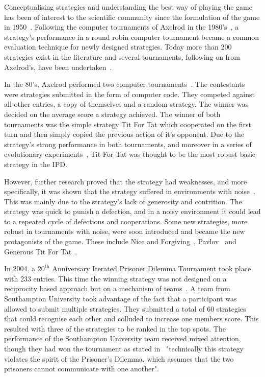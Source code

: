 \documentclass{article}
\begin{document}
Conceptualising strategies and understanding the best way of playing the game
has been of interest to the scientific community since the formulation of the
game in 1950~\cite{Flood1958}. Following the computer tournaments of Axelrod in the
1980's~\cite{Axelrod1980a, Axelrod1980b}, a strategy's performance in a round
robin computer tournament became a common evaluation technique for newly designed
strategies. Today more than 200 strategies exist in the literature and several
tournaments, following on from Axelrod's, have been undertaken~\cite{Bendor1991,
Harper2017, Kendall2007, Stephens2002, Stewart2012}.

In the 80's, Axelrod performed two computer tournaments~\cite{Axelrod1980a,
Axelrod1980b}. The contestants were strategies submitted in the form of computer
code. They competed against all other entries, a copy of themselves and a random
strategy. The winner was decided on the average score a strategy achieved. The
winner of both tournaments was the simple strategy Tit For Tat which cooperated
on the first turn and then simply copied the previous action of it's opponent.
Due to the strategy's strong performance in both tournaments, and moreover in a
series of evolutionary experiments~\cite{Axelrod1981}, Tit For Tat was thought
to be the most robust basic strategy in the IPD.

However, further research proved that the strategy had weaknesses, and more
specifically, it was shown that the strategy suffered in environments with
noise~\cite{Bendor1991, Donninger1986, Molander1985, Hammerstein1984}. This was
mainly due to the strategy's lack of generosity and contrition. The strategy was
quick to punish a defection, and in a noisy environment it could lead to a
repeated cycle of defections and cooperations. Some new strategies, more
robust in tournaments with noise, were soon introduced and became the new
protagonists of the game. These include Nice and Forgiving~\cite{Bendor1991},
Pavlov~\cite{Nowak1993} and Generous Tit For Tat~\cite{Nowak1992}.

In 2004, a $20^{\text{th}}$ Anniversary Iterated Prisoner Dilemma Tournament
took place with 233 entries. This time the winning strategy was not designed on
a reciprocity based approach but on a mechanism of
teams~\cite{J.P.Delahaye1993Lp, J.P.Delahaye1995LIeP, A.Rogers2007Ctpw}. A team
from Southampton University took advantage of the fact that a participant was
allowed to submit multiple strategies. They submitted a total of 60 strategies
that could recognise each other and colluded to increase one members score.
This resulted with three of the strategies to be ranked in the top spots. The
performance of the Southampton University team received mixed attention, though
they had won the tournament as stated in~\cite{us_blog} "technically this
strategy violates the spirit of the Prisoner's Dilemma, which assumes that the
two prisoners cannot communicate with one another".
\end{document}
